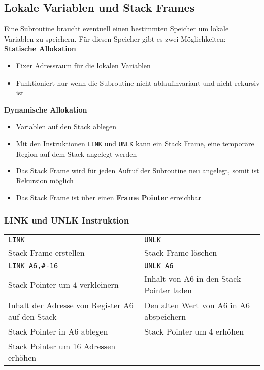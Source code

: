 \subsection{Lokale Variablen und Stack Frames}
Eine Subroutine braucht eventuell einen bestimmten Speicher um lokale Variablen zu speichern. Für diesen Speicher gibt es zwei Möglichkeiten: \\
\textbf{Statische Allokation}
\begin{itemize}
  \item Fixer Adressraum für die lokalen Variablen
  \item Funktioniert nur wenn die Subroutine nicht ablaufinvariant und nicht rekursiv ist
\end{itemize}
\textbf{Dynamische Allokation}
\begin{itemize}
  \item Variablen auf den Stack ablegen
  \item Mit den Instruktionen \verb+LINK+ und \verb+UNLK+ kann ein Stack Frame, eine temporäre Region auf dem Stack angelegt werden
  \item Das Stack Frame wird für jeden Aufruf der Subroutine neu angelegt, somit ist Rekursion möglich
  \item Das Stack Frame ist über einen \textbf{Frame Pointer} erreichbar
\end{itemize}


\subsubsection{LINK und UNLK Instruktion}
\begin{tabular}{l|l}
	\verb+LINK+											& \verb+UNLK+ \\
	Stack Frame erstellen								& Stack Frame löschen \\
	\hline
	\verb+LINK A6,#-16+									& \verb+UNLK A6+ \\
	Stack Pointer um 4 verkleinern						& Inhalt von A6 in den Stack Pointer laden \\
	Inhalt der Adresse von Register A6 auf den Stack	& Den alten Wert von A6 in A6 abspeichern \\
	Stack Pointer in A6 ablegen							& Stack Pointer um 4 erhöhen \\
	Stack Pointer um 16 Adressen erhöhen				& 
\end{tabular}